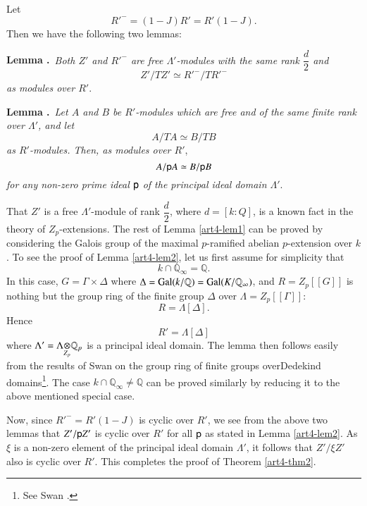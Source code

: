 Let\pageoriginale
$$
{R'}^{-}=(1-J)R'=R'(1-J).
$$
Then we have the following two lemmas:

\medskip
\noindent
{\bf Lemma .\label{art4-lem1}}~{\em Both $Z'$ and ${R'}^{-}$ are free $\Lambda'$-modules with the same rank $\dfrac{d}{2}$ and}
$$
Z'/TZ'\simeq {R'}^{-}/T{R'}^{-}
$$
{\em as modules over $R'$}.

\medskip
\noindent
{\bf Lemma .\label{art4-lem2}}~{\em Let $A$ and $B$ be $R'$-modules which are free and of the same finite rank over $\Lambda'$, and let}
$$
A/TA\simeq B/TB
$$
{\em as $R'$-modules. Then, as modules over $R'$},
$$
A/\mathsf{p} A\simeq B/\mathsf{p} B
$$
{\em for any non-zero prime ideal $\mathsf{p}$ of the principal ideal domain $\Lambda'$}.
\medskip

That $Z'$ is a free $\Lambda'$-module of rank $\dfrac{d}{2}$, where $d=[k:Q]$, is a known fact in the theory of $Z_{p}$-extensions. The rest of Lemma \ref{art4-lem1} can be proved by considering the Galois group of the maximal $p$-ramified abelian $p$-extension over $k$. To see the proof of Lemma \ref{art4-lem2}, let us first assume for simplicity that
$$
k\cap \mathbb{Q}_{\infty}=\mathbb{Q}.
$$
In this case, $G=\Gamma\times \Delta$ where $\Delta=\operatorname{Gal}(k/\mathbb{Q})=\operatorname{Gal}(K/\mathbb{Q}_{\infty})$, and $R=Z_{p}[[G]]$ is nothing but the group ring of the finite group $\Delta$ over $\Lambda=Z_{p}[[\Gamma]]$:
$$
R=\Lambda[\Delta].
$$
Hence
$$
R'=\Lambda [\Delta]
$$
where $\Lambda'=\foprod{\Lambda}{\mathbb{Q}_{p}}{Z_p}$ is a principal ideal domain. The lemma then follows easily from the results of Swan on the group ring of finite groups over\pageoriginale Dedekind domains\footnote[9]{See Swan \cite{art4-key7}.}. The case $k\cap \mathbb{Q}_{\infty}\neq \mathbb{Q}$ can be proved similarly by reducing it to the above mentioned special case.

Now, since ${R'}^{-}=R'(1-J)$ is cyclic over $R'$, we see from the above two lemmas that $Z'/\mathsf{p} Z'$ is cyclic over $R'$ for all $\mathsf{p}$ as stated in Lemma \ref{art4-lem2}. As $\xi$ is a non-zero element of the principal ideal domain $\Lambda'$, it follows that $Z'/\xi Z'$ also is cyclic over $R'$. This completes the proof of Theorem \ref{art4-thm2}.

